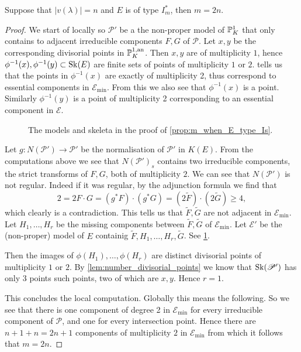 \begin{proposition}\label{prop:m_when_E_type_Is}
	Suppose that $|v(\lambda)| = n$ and $E$ is of type $I_m^*$, then $m = 2n$. 
\end{proposition}
\begin{proof}
	We start of locally so $\mathscr P'$ be a the non-proper model of $\mathbb{P}^{1}_K$ that only contains to adjacent irreducible components $F, G$ of  $\mathscr P$.
	Let $x, y $ be the corresponding divisorial points in $\mathbb{P}^{1, \text{an}}_K$. 
	Then $x, y$ are of multiplicity $1$, hence $\phi^{-1}(x), \phi^{-1}(y) \subset  \sk(E)$ are finite sets of points of multiplicity $1$ or $2$. 
	 tells us that the points in $\phi^{-1}(x)$ are exactly of multiplicity 2, thus correspond to essential components in $\mathscr E_\text{min} $.
	From this we also see that $\phi^{-1}(x)$ is a point. 
	Similarly $\phi^{-1}(y)$ is a point of multiplicity 2 corresponding to an essential component in $\mathscr E$. 

\begin{figure}[ht]
    \centering
    \caption{The models and skeleta in the proof of \cref{prop:m_when_E_type_Is}.}
    \label{fig:models_proof_is}
\end{figure}

	Let $g: N(\mathscr P') \to \mathscr P'$ be the normalisation of $\mathscr P'$ in $K(E)$.
	From the computations above we see that $N(\mathscr P')_s$ contains two irreducible components, the strict transforms of $F, G$, both of multiplicity $2$. 
	We can see that $N(\mathscr P')$ is not regular. 
	Indeed if it was regular, by the adjunction formula we find that \[
		2 = 2F\cdot G =  (g^* F)\cdot (g^* G) =  (2 \tilde F) \cdot  (2 \tilde G)  \ge 4
	,\] 
	which clearly is a contradiction. 
	This tells us that $\tilde F, \tilde G$ are not adjacent in $\mathscr E_\text{min} $. 
	Let $H_1, \ldots, H_r$ be the missing components between $\tilde F, \tilde G$ of $\mathscr E_\text{min} $. 
	Let $\mathscr E'$ be the (non-proper) model of $E$ containig $\tilde F, H_1, \ldots, H_r, \tilde G$. See \cref{fig:models_proof_is}.
	
Then the images of $\phi(H_1), \ldots, \phi(H_r)$ are distinct divisorial points of multiplicity $1$ or $2$.
By \cref{lem:number_divisorial_points} we know that $\operatorname{Sk}(\mathscr P')$ has only 3 points such points, two of which are $x, y$. 
Hence $r = 1$. 

This concludes the local computation. Globally this means the following. 
So we see that there is one component of degree 2 in $\mathscr E_\text{min} $ for every irreducible component of $\mathscr P$, and one for every intersection point. 
Hence there are $n + 1 + n = 2n + 1$ components of multiplicity $2$ in $\mathscr E_\text{min} $ from which it follows that $m = 2n$.  
\end{proof}



